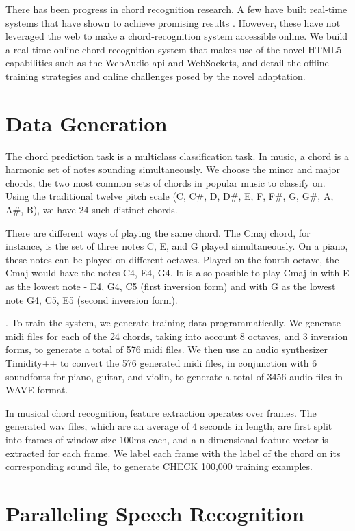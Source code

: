\documentclass{article}
\begin{document}
There has been progress in chord recognition research. A few have built real-time systems that have shown to achieve promising results \cite{fujishima, cho}. However, these have not leveraged the web to make a chord-recognition system accessible online. We build a real-time online chord recognition system that makes use of the novel HTML5 capabilities such as the WebAudio api and WebSockets, and detail the offline training strategies and online challenges posed by the novel adaptation.

\section{Data Generation}
The chord prediction task is a multiclass classification task. In music, a chord is a harmonic set of notes sounding simultaneously. We choose the minor and major chords, the two most common sets of chords in popular music to classify on. Using the traditional twelve pitch scale (C, C\#, D, D\#, E, F, F\#, G, G\#, A, A\#, B), we have 24 such distinct chords.

There are different ways of playing the same chord. The Cmaj chord, for instance, is the set of three notes C, E, and G played simultaneously. On a piano, these notes can be played on different octaves. Played on the fourth octave, the Cmaj would have the notes C4, E4, G4. It is also possible to play Cmaj in with E as the lowest note - E4, G4, C5 (first inversion form) and with G as the lowest note G4, C5, E5 (second inversion form).

\cite{lee}. To train the system, we generate training data programmatically. We generate midi files for each of the 24 chords, taking into account 8 octaves, and 3 inversion forms, to generate a total of 576 midi files. We then use an audio synthesizer Timidity++ to convert the 576 generated midi files, in conjunction with 6 soundfonts for piano, guitar, and violin, to generate a total of 3456 audio files in WAVE format.

In musical chord recognition, feature extraction operates over frames. The generated wav files, which are an average of 4 seconds in length, are first split into frames of window size 100ms each, and a n-dimensional feature vector is extracted for each frame. We label each frame with the label of the chord on its corresponding sound file, to generate CHECK 100,000 training examples.

\section{Paralleling Speech Recognition}
\end{document}
